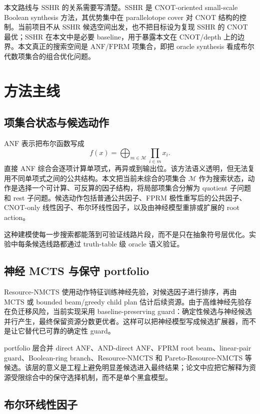 \documentclass[UTF8,fontset=macnew,11pt]{ctexart}
\newcommand{\method}{Resource-NMCTS}
\newcommand{\pareto}{Pareto-Resource-NMCTS}
\newcommand{\anf}{\ensuremath{\mathrm{ANF}}}
\newcommand{\fprm}{\ensuremath{\mathrm{FPRM}}}
\newcommand{\mcts}{\ensuremath{\mathrm{MCTS}}}
\begin{document}
本文路线与 SSHR 的关系需要写清楚。SSHR 是 CNOT-oriented small-scale Boolean synthesis 方法\cite{zheng2025sshr}，其优势集中在 parallelotope cover 对 CNOT 结构的控制。当前项目不从 SSHR 候选空间出发，也不把目标设为复现 SSHR 的 CNOT 最优；SSHR 在本文中是必要 baseline，用于暴露本文在 CNOT/depth 上的边界。本文真正的搜索空间是 \anf{}/\fprm{} 项集合，即把 oracle synthesis 看成布尔代数项集合的组合优化问题。

\section{方法主线}

\subsection{项集合状态与候选动作}

\anf{} 表示把布尔函数写成
\begin{equation}
  f(x)=\bigoplus_{m\in\mathcal{M}}\prod_{i\in m}x_i .
  \label{eq:anf}
\end{equation}
直接 ANF 综合会逐项计算单项式，再异或到输出位。该方法语义透明，但无法复用不同单项式之间的公共结构。本文把当前未综合的项集合 $\mathcal{M}$ 作为搜索状态，动作是选择一个可计算、可反算的因子结构，将局部项集合分解为 quotient 子问题和 rest 子问题。候选动作包括普通公共因子、FPRM 极性重写后的公共因子、CNOT-only 线性因子、布尔环线性因子，以及由神经模型重排或扩展的 root action。

这种建模使每一步搜索都能落到可验证线路片段，而不是只在抽象符号层优化。实验中每条候选线路都通过 truth-table 级 oracle 语义验证。

\subsection{神经 MCTS 与保守 portfolio}

\method{} 使用动作特征训练神经先验，对候选因子进行排序，再由 \mcts{} 或 bounded beam/greedy child plan 估计后续资源。由于高维神经先验存在负迁移风险，当前实现采用 baseline-preserving guard：确定性候选与神经候选并行产生，最终保留资源分数更优者。这样可以把神经模型写成候选扩展器，而不是让它替代已可靠的确定性 guard。

portfolio 层合并 direct ANF、AND-direct ANF、FPRM root beam、linear-pair guard、Boolean-ring branch、\method{} 和 \pareto{} 等候选。该层的意义是工程上避免明显差候选进入最终结果；论文中应把它解释为资源受限综合中的保守选择机制，而不是单个黑盒模型。

\subsection{布尔环线性因子}
\end{document}
